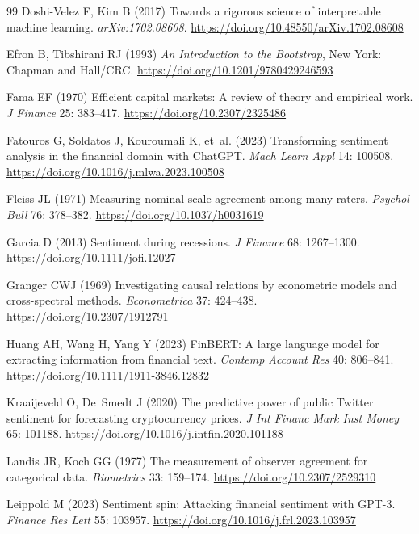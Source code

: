 \documentclass[12pt,a4paper]{article}
\begin{document}
\begin{thebibliography}{99}
Doshi-Velez F, Kim B (2017) Towards a rigorous science of interpretable machine
learning. \emph{arXiv:1702.08608}. \url{https://doi.org/10.48550/arXiv.1702.08608}

Efron B, Tibshirani RJ (1993) \emph{An Introduction to the Bootstrap}, New York:
Chapman and Hall/CRC. \url{https://doi.org/10.1201/9780429246593}

Fama EF (1970) Efficient capital markets: A review of theory and empirical work.
\emph{J Finance} 25: 383--417. \url{https://doi.org/10.2307/2325486}

Fatouros G, Soldatos J, Kouroumali K, et~al. (2023) Transforming sentiment analysis
in the financial domain with ChatGPT. \emph{Mach Learn Appl} 14: 100508. \url{https://doi.org/10.1016/j.mlwa.2023.100508}

Fleiss JL (1971) Measuring nominal scale agreement among many raters. \emph{Psychol
Bull} 76: 378--382. \url{https://doi.org/10.1037/h0031619}

Garcia D (2013) Sentiment during recessions. \emph{J Finance} 68: 1267--1300. \url{https://doi.org/10.1111/jofi.12027}

Granger CWJ (1969) Investigating causal relations by econometric models and
cross-spectral methods. \emph{Econometrica} 37: 424--438. \url{https://doi.org/10.2307/1912791}

Huang AH, Wang H, Yang Y (2023) FinBERT: A large language model for extracting
information from financial text. \emph{Contemp Account Res} 40: 806--841. \url{https://doi.org/10.1111/1911-3846.12832}

Kraaijeveld O, De~Smedt J (2020) The predictive power of public Twitter sentiment for
forecasting cryptocurrency prices. \emph{J Int Financ Mark Inst Money} 65: 101188. \url{https://doi.org/10.1016/j.intfin.2020.101188}

Landis JR, Koch GG (1977) The measurement of observer agreement for categorical data.
\emph{Biometrics} 33: 159--174. \url{https://doi.org/10.2307/2529310}

Leippold M (2023) Sentiment spin: Attacking financial sentiment with GPT-3.
\emph{Finance Res Lett} 55: 103957. \url{https://doi.org/10.1016/j.frl.2023.103957}


\end{thebibliography}
\end{document}
